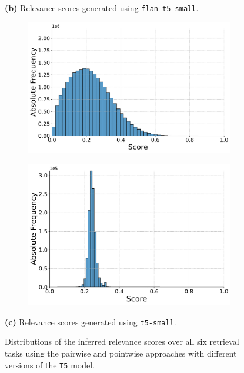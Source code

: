 \begin{figure}[ht!]
    \vspace{-0.5cm}
    \textbf{(b)} Relevance scores generated using \texttt{flan-t5-small}.
    \vspace{0.5cm}

    \begin{subfigure}[b]{0.49\textwidth}
        \centering
        \includegraphics[width=\textwidth]{graphics/seaborn/pairwise_self_score_distribution_t5-small.pdf}
        \label{fig:pairwise_t5-small}
    \end{subfigure}
    \hfill
    \begin{subfigure}[b]{0.49\textwidth}
        \centering
        \includegraphics[width=\textwidth]{graphics/seaborn/pointwise_self_score_distribution_t5-small.pdf}
        \label{fig:pointwise_t5-small}
    \end{subfigure}

    \vspace{-0.5cm}
    \textbf{(c)} Relevance scores generated using \texttt{t5-small}.
    \vspace{0.5cm}

    \caption{Distributions of the inferred relevance scores over all six retrieval tasks using the pairwise and pointwise approaches with different versions of the \texttt{T5} model.}
    \label{fig:score-distributions}
\end{figure}
